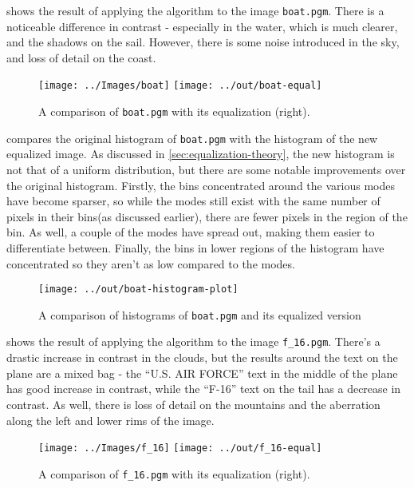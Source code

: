 \documentclass[headings=optiontoheadandtoc,listof=totoc,parskip=full]{scrartcl}
\begin{document}
 shows the result of applying the algorithm to the image \texttt{boat.pgm}. There is a noticeable difference in contrast - especially in the water, which is much clearer, and the shadows on the sail. However, there is some noise introduced in the sky, and loss of detail on the coast.

\begin{figure}[H]
	\centering
	\texttt{[image: ../Images/boat]}
	\texttt{[image: ../out/boat-equal]}
	\caption{A comparison of \texttt{boat.pgm} with its equalization (right).}
	\label{fig:equal-result-1}
\end{figure}

 compares the original histogram of \texttt{boat.pgm} with the histogram of the new equalized image. As discussed in \cref{sec:equalization-theory}, the new histogram is not that of a uniform distribution, but there are some notable improvements over the original histogram. Firstly, the bins concentrated around the various modes have become sparser, so while the modes still exist with the same number of pixels in their bins(as discussed earlier), there are fewer pixels in the region of the bin. As well, a couple of the modes have spread out, making them easier to differentiate between. Finally, the bins in lower regions of the histogram have concentrated so they aren't as low compared to the modes.

\begin{figure}[H]
	\centering\texttt{[image: ../out/boat-histogram-plot]}
	\caption{A comparison of histograms of \texttt{boat.pgm} and its equalized version}
	\label{fig:equal-histogram-1}
\end{figure}

 shows the result of applying the algorithm to the image \texttt{f\_16.pgm}. There's a drastic increase in contrast in the clouds, but the results around the text on the plane are a mixed bag - the ``U.S. AIR FORCE'' text in the middle of the plane has good increase in contrast, while the ``F-16'' text on the tail has a decrease in contrast. As well, there is loss of detail on the mountains and the aberration along the left and lower rims of the image.

\begin{figure}[H]
	\centering
	\texttt{[image: ../Images/f\_16]}
	\texttt{[image: ../out/f\_16-equal]}
	\caption{A comparison of \texttt{f\_16.pgm} with its equalization (right).}
	\label{fig:equal-result-2}
\end{figure}
\end{document}
